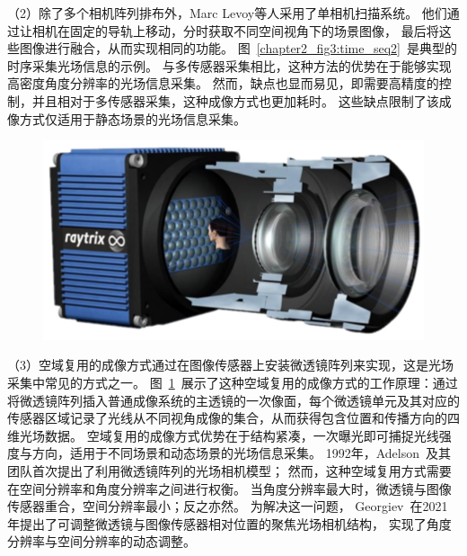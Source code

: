 （2）除了多个相机阵列排布外，Marc Levoy等人\cite{levoy2023light}采用了单相机扫描系统。
他们通过让相机在固定的导轨上移动，分时获取不同空间视角下的场景图像，
最后将这些图像进行融合，从而实现相同的功能。
图~\ref{chapter2_fig3:time_seq2}~是典型的时序采集光场信息的示例。
与多传感器采集相比，这种方法的优势在于能够实现高密度角度分辨率的光场信息采集。
然而，缺点也显而易见，即需要高精度的控制，并且相对于多传感器采集，这种成像方式也更加耗时。
这些缺点限制了该成像方式仅适用于静态场景的光场信息采集。\par
%
%
%
%
%
\begin{figure}[!ht]
	\centering
	\includegraphics[width=0.65\linewidth]{figures/chapter2/microlens_for_lf_imaging2.drawio}
	\label{chapter2_fig4:microlens_for_lf_imaging}
\end{figure}
（3）空域复用的成像方式通过在图像传感器上安装微透镜阵列来实现，这是光场采集中常见的方式之一。
图~\ref{chapter2_fig4:microlens_for_lf_imaging}~展示了这种空域复用的成像方式的工作原理：通过将微透镜阵列插入普通成像系统的主透镜的一次像面，每个微透镜单元及其对应的传感器区域记录了光线从不同视角成像的集合，从而获得包含位置和传播方向的四维光场数据。
空域复用的成像方式优势在于结构紧凑，一次曝光即可捕捉光线强度与方向，适用于不同场景和动态场景的光场信息采集。
1992年，Adelson~\cite{adelson1992single}及其团队首次提出了利用微透镜阵列的光场相机模型；
然而，这种空域复用方式需要在空间分辨率和角度分辨率之间进行权衡。
当角度分辨率最大时，微透镜与图像传感器重合，空间分辨率最小；反之亦然。
为解决这一问题，
Georgiev~\cite{georgiev2010focused}在2021年提出了可调整微透镜与图像传感器相对位置的聚焦光场相机结构，
实现了角度分辨率与空间分辨率的动态调整。
%
%
%

